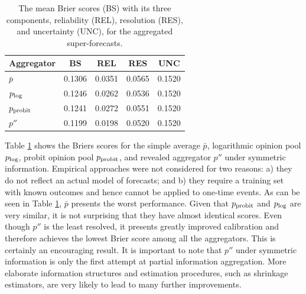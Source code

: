 \documentclass[12pt]{article}
\theoremstyle{definition}
\theoremstyle{definition}
\def\probit{p_{\rm probit}}
\def\plog{p_{\rm log}}
\begin{document}
 
\begin{table}[t]
\centering
\caption{The mean Brier scores (BS) with its three components, reliability (REL), resolution (RES), and uncertainty (UNC), for the aggregated super-forecasts.}
\begin{tabular}{lcccc}
  \hline\hline
Aggregator & BS & REL & RES & UNC \\ 
  \hline
$\bar{p}$ & 0.1306 & 0.0351 & 0.0565 & 0.1520 \\ 
 $\plog$ & 0.1246 & 0.0262 & 0.0536 & 0.1520 \\ 
 $\probit$ & 0.1241 & 0.0272 & 0.0551 & 0.1520 \\ 
 $p''$ & 0.1199 & 0.0198 & 0.0520 & 0.1520 \\ 
   \hline
\end{tabular}
\label{BrierTable}
\end{table}

Table \ref{BrierTable} shows the Briers scores for the simple average $\bar{p}$, logarithmic opinion pool $\plog$, probit opinion pool $\probit$, and revealed aggregator $p''$ under symmetric
information. Empirical approaches were not considered for two
reasons: a) they do not reflect an actual model of forecasts; and b)
they require a training set with known outcomes and hence cannot be
applied to one-time events. As can be seen in Table \ref{BrierTable}, $\bar{p}$ presents the worst performance. Given that  $\probit$ and $\plog$ are
very similar, it is not surprising that they have almost identical scores. Even
though $p''$ is the least resolved, it presents
greatly improved calibration and therefore achieves the lowest Brier
score among all the aggregators. This is certainly an encouraging
result. It is important to note that $p''$
under symmetric information is only the first attempt at partial
information aggregation. 
More elaborate information structures and
estimation procedures, such as shrinkage estimators, are very likely to lead to many further
improvements.

\end{document}
